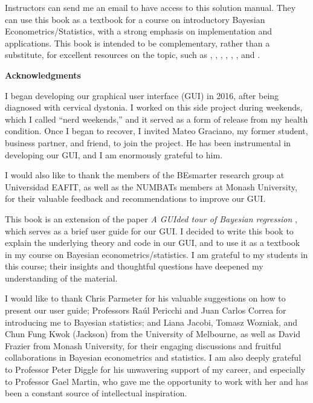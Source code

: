 Instructors can send me an email to have access to this solution manual. They can use this book as a textbook for a course on introductory Bayesian Econometrics/Statistics, with a strong emphasis on implementation and applications. This book is intended to be complementary, rather than a substitute, for excellent resources on the topic, such as \cite{gelman2021bayesian}, \cite{chan2019bayesian}, \cite{rossi2012bayesian}, \cite{greenberg2012introduction}, \cite{geweke2005contemporary}, \cite{lancaster2004introduction}, and \cite{koop2003bayesian}.


\textbf{Acknowledgments}

I began developing our graphical user interface (GUI) in 2016, after being diagnosed with cervical dystonia. I worked on this side project during weekends, which I called ``nerd weekends,'' and it served as a form of release from my health condition. Once I began to recover, I invited Mateo Graciano, my former student, business partner, and friend, to join the project. He has been instrumental in developing our GUI, and I am enormously grateful to him. 

I would also like to thank the members of the BEsmarter research group at Universidad EAFIT, as well as the NUMBATs members at Monash University, for their valuable feedback and recommendations to improve our GUI.

This book is an extension of the paper \textit{A GUIded tour of Bayesian regression} \cite{Ramirez2020}, which serves as a brief user guide for our GUI. I decided to write this book to explain the underlying theory and code in our GUI, and to use it as a textbook in my course on Bayesian econometrics/statistics. I am grateful to my students in this course; their insights and thoughtful questions have deepened my understanding of the material.

I would like to thank Chris Parmeter for his valuable suggestions on how to present our user guide; Professors Raúl Pericchi and Juan Carlos Correa for introducing me to Bayesian statistics; and Liana Jacobi, Tomasz Wozniak, and Chun Fung Kwok (Jackson) from the University of Melbourne, as well as David Frazier from Monash University, for their engaging discussions and fruitful collaborations in Bayesian econometrics and statistics. I am also deeply grateful to Professor Peter Diggle for his unwavering support of my career, and especially to Professor Gael Martin, who gave me the opportunity to work with her and has been a constant source of intellectual inspiration.  

